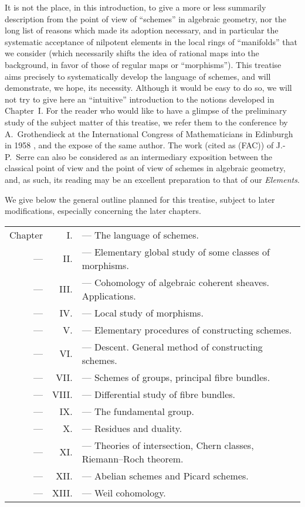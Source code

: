 It is not the place, in this introduction, to give a more or less summarily
description from the point of view of ``schemes'' in algebraic geometry, nor the
long list of reasons which made its adoption necessary, and in particular the
systematic acceptance of nilpotent elements in the local rings of ``manifolds''
that we consider (which necessarily shifts the idea of rational maps into
the background, in favor of those of regular maps or ``morphisms''). This
treatise aims precisely to systematically develop the language of schemes, and
will demonstrate, we hope, its necessity. Although it would be easy to do so,
we will not try to give here an ``intuitive'' introduction to the
notions developed in Chapter~I. For the reader who would like to have a glimpse
of the preliminary study of the subject matter of this treatise, we refer them
to the conference by A.~Grothendieck at the International Congress of
Mathematicians in Edinburgh in 1958 \cite{I-7}, and the expose \cite{I-8} of the
same author. The work \cite{I-14} (cited as (FAC)) of J.-P.~Serre can also be
considered as an intermediary exposition between the classical point of view and
the point of view of schemes in algebraic geometry, and, as such, its reading
may be an excellent preparation to that of our {\it Elements}.

\sectionbreak

We give below the general outline planned for this treatise, subject to later
modifications, especially concerning the later chapters.

\begin{tabular}{rrl}
Chapter & I. & --- The language of schemes.\\
--- & II. & --- Elementary global study of some classes of morphisms.\\
--- & III. & --- Cohomology of algebraic coherent sheaves. Applications.\\
--- & IV. & --- Local study of morphisms.\\
--- & V. & --- Elementary procedures of constructing schemes.\\
--- & VI. & --- Descent. General method of constructing schemes.\\
--- & VII. & --- Schemes of groups, principal fibre bundles.\\
--- & VIII. & --- Differential study of fibre bundles.\\
--- & IX. & --- The fundamental group.\\
--- & X. & --- Residues and duality.\\
--- & XI. & --- Theories of intersection, Chern classes,
Riemann--Roch theorem.\\
--- & XII. & --- Abelian schemes and Picard schemes.\\
--- & XIII. & --- Weil cohomology.
\end{tabular}\\

